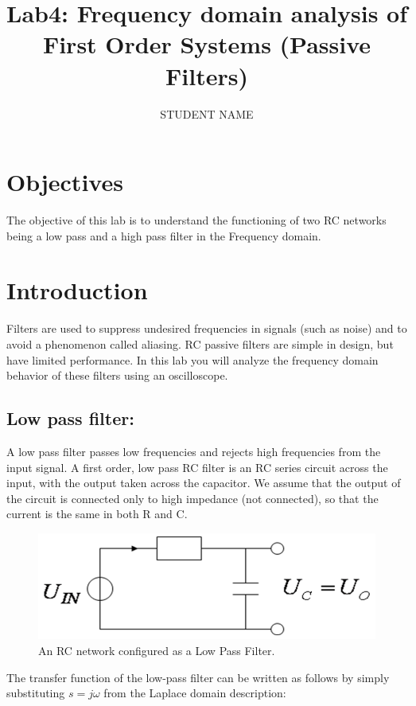 \documentclass[11pt,letterpaper]{article}
\author{STUDENT NAME}
\title{Lab4: Frequency domain analysis of First Order Systems (Passive Filters)}
\begin{document}
\maketitle

\section{Objectives}

The objective of this lab is to understand the functioning of two RC networks being a low pass and a high pass filter in the Frequency domain.

\section{Introduction}

Filters are used to suppress undesired frequencies in signals (such as noise) and to avoid a phenomenon called aliasing. RC passive filters are simple in design, but have limited performance. In this lab you will analyze the frequency domain behavior of these filters using an oscilloscope.

\subsection{Low pass filter:}

A low pass filter passes low frequencies and rejects high frequencies from the input signal. A first order, low pass RC filter is an RC series circuit across the input, with the output taken across the capacitor. We assume that the output of the circuit is connected only to high impedance (not connected), so that the current is the same in both R and C. 

\begin{figure}
\centering
\includegraphics[width=0.7\linewidth]{Lab4_LowPassFilter}
\caption{An RC network configured as a Low Pass Filter.}
\label{fig:Lab4_LowPassFilter}
\end{figure}

The transfer function of the low-pass filter can be written as follows by simply substituting $s = j \omega$  from the Laplace domain description:
\end{document}
